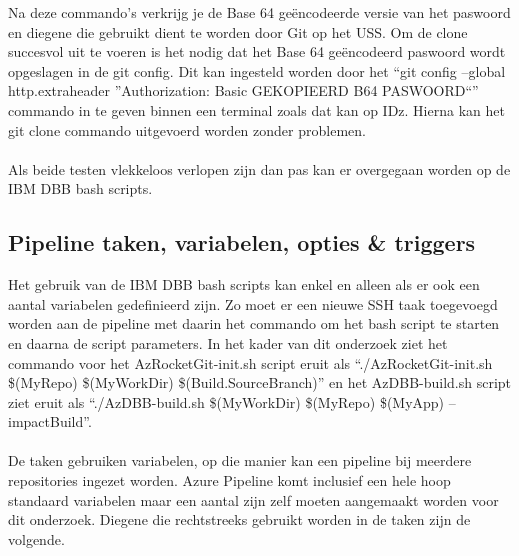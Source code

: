 Na deze commando's verkrijg je de Base 64 geëncodeerde versie van het paswoord en diegene die gebruikt dient te worden door Git op het USS. Om de clone succesvol uit te voeren is het nodig dat het Base 64 geëncodeerd paswoord wordt opgeslagen in de git config. Dit kan ingesteld worden door het \enquote{git config --global http.extraheader \textquotedblright Authorization: Basic GEKOPIEERD B64 PASWOORD\textquotedblleft} commando in te geven binnen een terminal zoals dat kan op IDz. Hierna kan het git clone commando uitgevoerd worden zonder problemen. 
\\ \\
Als beide testen vlekkeloos verlopen zijn dan pas kan er overgegaan worden op de IBM DBB bash scripts. 

\subsection{Pipeline taken, variabelen, opties \& triggers}
Het gebruik van de IBM DBB bash scripts kan enkel en alleen als er ook een aantal variabelen gedefinieerd zijn. Zo moet er een nieuwe SSH taak toegevoegd worden aan de pipeline met daarin het commando om het bash script te starten en daarna de script parameters. In het kader van dit onderzoek ziet het commando voor het AzRocketGit-init.sh script eruit als \enquote{./AzRocketGit-init.sh \$(MyRepo) \$(MyWorkDir) \$(Build.SourceBranch)} en het AzDBB-build.sh script ziet eruit als \enquote{./AzDBB-build.sh \$(MyWorkDir) \$(MyRepo) \$(MyApp) --impactBuild}.
\\ \\
De taken gebruiken variabelen, op die manier kan een pipeline bij meerdere repositories ingezet worden. Azure Pipeline komt inclusief een hele hoop standaard variabelen maar een aantal zijn zelf moeten aangemaakt worden voor dit onderzoek. Diegene die rechtstreeks gebruikt worden in de taken zijn de volgende. 

